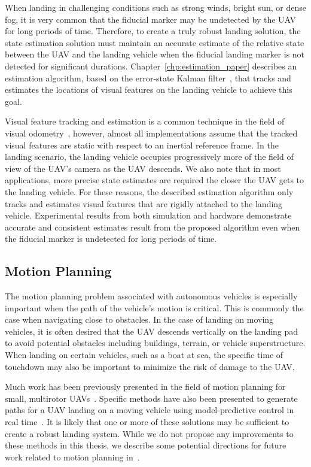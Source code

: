 When landing in challenging conditions such as strong winds, bright sun, or
dense fog, it is very common that the fiducial marker may be undetected by the UAV
for long periods of time. Therefore, to create a truly robust landing solution,
the state estimation solution must maintain an accurate estimate of the relative
state between the UAV and the landing vehicle when the fiducial landing marker
is not detected for significant durations. Chapter~\ref{chp:estimation_paper}
describes an estimation algorithm, based on the error-state Kalman
filter~\cite{roumeliotis1999circumventing}, that tracks and estimates the locations of
visual features on the landing vehicle to achieve this goal.

Visual feature
tracking and estimation is a common technique in the field of visual
odometry~\cite{qin2018vins}, however, almost all implementations assume that the
tracked visual features are static with respect to an inertial reference frame.
In the landing scenario, the landing vehicle occupies progressively more of the
field of view of the UAV's camera as the UAV descends. We also note that in most
applications, more precise state estimates are required the closer the UAV gets
to the landing vehicle. For these reasons, the described estimation algorithm
only tracks and estimates visual features that are rigidly attached to the landing vehicle.
Experimental results
from both simulation and hardware demonstrate accurate and consistent estimates
result from the proposed algorithm even when the fiducial marker is undetected
for long periods of time.

\subsection{Motion Planning}
The motion planning problem associated with autonomous vehicles is especially
important when the path of the vehicle's motion is critical.
This is commonly the case when
navigating close to obstacles. In the case of landing on moving vehicles, it is
often desired that the UAV descends vertically on the landing pad to avoid
potential obstacles including buildings, terrain, or vehicle superstructure.
When landing on certain vehicles, such as a boat at sea, the specific time of
touchdown may also be important to minimize the risk of damage to the UAV.

Much work has been previously presented in the field of motion planning for
small, multirotor UAVs~\cite{mellinger2011minimum}. Specific methods have also been 
presented to generate paths for a UAV landing on a moving
vehicle using model-predictive control in real time~\cite{baca2019autonomous}.
It is likely that one or more of these solutions may be sufficient to create a
robust landing system.
While we do not propose any improvements to these methods in this thesis, we
describe some potential directions for future work related to motion planning
in~.

